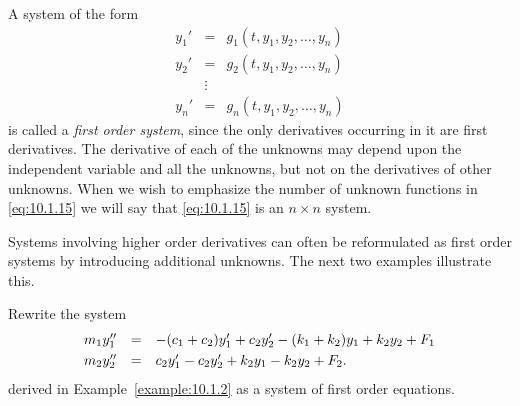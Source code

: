 
\noindent
A system of the form
\begin{equation}
  \label{eq:10.1.15}
  \begin{array}{ccl}
    y_{1}' & =      & g_{1}(t,y_{1},y_{2},\dots,y_{n}) \\
    y_{2}' & =      & g_{2}(t,y_{1},y_{2},\dots,y_{n}) \\
           & \vdots &                                  \\
    y_{n}' & =      & g_{n}(t,y_{1},y_{2},\dots,y_{n})
  \end{array}
\end{equation}
is called a {\color{blue}\it first order system\/}, since the only derivatives occurring in it are
first derivatives. The derivative of each of the unknowns may depend upon the independent variable
and all the unknowns, but not on the derivatives of other unknowns. When we wish to emphasize the
number of unknown functions in \eqref{eq:10.1.15} we will say that \eqref{eq:10.1.15} is an
$n\times n$ system.

Systems involving higher order derivatives can often be reformulated as first order systems by
introducing additional unknowns. The next two examples illustrate this.

\begin{example}
  \label{example:10.1.4} \rm Rewrite the system
  \begin{equation}
    \label{eq:10.1.16}
    \begin{array}{rcl}
      m_{1}y_{1}'' & = & -(c_{1}+c_{2})y_{1}'+c_{2}y_{2}'-(k_{1}+k_{2})y_{1}+k_{2}y_{2}+F_{1} \\[1\jot]
      m_{2}y_{2}'' & = & c_{2}y_{1}'-c_{2}y_{2}'+k_{2}y_{1}-k_{2}y_{2}+F_{2}.
    \end{array}
  \end{equation}
  derived in Example~\ref{example:10.1.2} as a system of first order equations.
\end{example}

